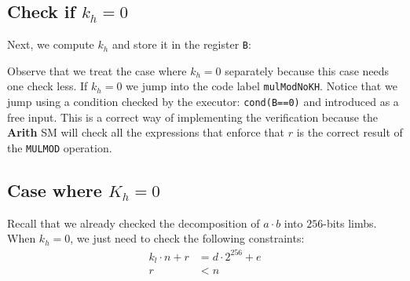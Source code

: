 \subsection{Check if $k_h = 0$}

 Next, we compute $k_h$ and store it in the register \texttt{B}:



 Observe that we treat the case where $k_h = 0$ separately because 
this case needs one check less.
 If $k_h = 0$ we jump into the code label \texttt{mulModNoKH}.
 Notice that we jump using a condition checked by the 
executor: \texttt{cond(B==0)} and introduced as a free input.
 This is a correct way of implementing the verification because the \textbf{Arith} SM will check all the expressions that enforce that $r$ is the correct result of the \texttt{MULMOD} operation.









\subsection{Case where $K_h = 0$}




Recall that we already checked the decomposition of $a \cdot b$ into $256$-bits limbs. When $k_h=0$, we just need to check the following constraints:
\begin{align*}
k_l \cdot n+r &= d \cdot 2^{256}+e \\
r &< n
\end{align*}

